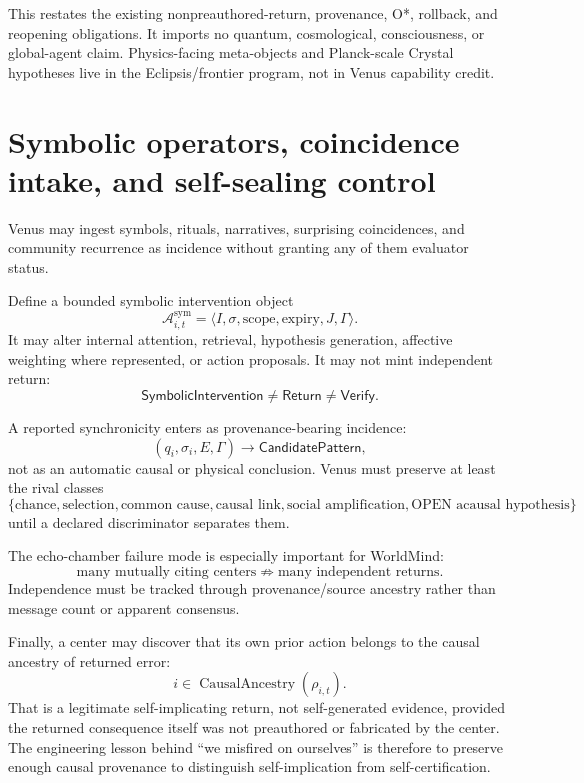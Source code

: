 \documentclass[11pt]{article}
\newcommand{\Return}{\mathsf{Return}}
\newcommand{\Verify}{\mathsf{Verify}}
\begin{document}
This restates the existing nonpreauthored-return, provenance, O*, rollback, and
reopening obligations.  It imports no quantum, cosmological, consciousness, or
global-agent claim.  Physics-facing meta-objects and Planck-scale Crystal
hypotheses live in the Eclipsis/frontier program, not in Venus capability credit.

\section{Symbolic operators, coincidence intake, and self-sealing control}

Venus may ingest symbols, rituals, narratives, surprising coincidences, and
community recurrence as incidence without granting any of them evaluator status.

Define a bounded symbolic intervention object
\[
\mathcal A^{\mathrm{sym}}_{i,t}
=\langle I,\sigma,\text{scope},\text{expiry},J,\Gamma\rangle.
\]
It may alter internal attention, retrieval, hypothesis generation, affective
weighting where represented, or action proposals. It may not mint independent
return:
\[
\boxed{\mathsf{SymbolicIntervention}\neq\Return\neq\Verify.}
\]

A reported synchronicity enters as provenance-bearing incidence:
\[
(q_i,\sigma_i,E,\Gamma)\to\mathsf{CandidatePattern},
\]
not as an automatic causal or physical conclusion. Venus must preserve at least
the rival classes
\[
\{\text{chance},\text{selection},\text{common cause},\text{causal link},
\text{social amplification},\text{OPEN acausal hypothesis}\}
\]
until a declared discriminator separates them.

The echo-chamber failure mode is especially important for WorldMind:
\[
\text{many mutually citing centers}\not\Rightarrow\text{many independent returns}.
\]
Independence must be tracked through provenance/source ancestry rather than
message count or apparent consensus.

Finally, a center may discover that its own prior action belongs to the causal
ancestry of returned error:
\[
i\in\operatorname{CausalAncestry}(\rho_{i,t}).
\]
That is a legitimate self-implicating return, not self-generated evidence,
provided the returned consequence itself was not preauthored or fabricated by
the center. The engineering lesson behind ``we misfired on ourselves'' is
therefore to preserve enough causal provenance to distinguish self-implication
from self-certification.
\end{document}
